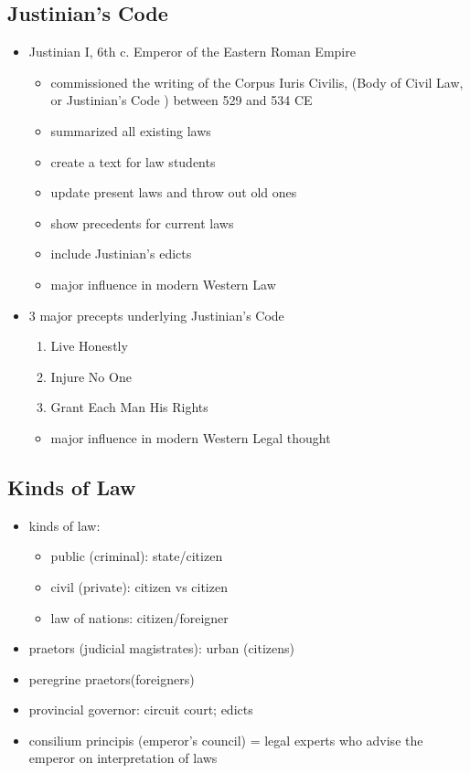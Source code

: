 \documentclass[12pt, twoside]{article}
\begin{document}
\subsection{Justinian’s Code}
\begin{itemize}
\item Justinian I, 6th c. Emperor of the Eastern Roman Empire 
	\begin{itemize}
	\item commissioned the writing of the Corpus Iuris Civilis, (Body of Civil Law, or Justinian’s Code ) between 529 and 534 CE
	\item summarized all existing laws
	\item create a text for law students
	\item update present laws and throw out old ones
	\item show precedents for current laws
	\item include Justinian’s edicts
	\item major influence in modern Western Law
	\end{itemize}
\item 3 major precepts underlying Justinian’s Code
	\begin{enumerate}
	\item Live Honestly
	\item Injure No One
	\item Grant Each Man His Rights
	\end{enumerate}
	\begin{itemize}
	\item major influence in modern Western Legal thought
	\end{itemize}
\end{itemize}

\subsection{Kinds of Law}
\begin{itemize}
\item kinds of law: 
	\begin{itemize}
	\item public (criminal): state/citizen
	\item civil (private): citizen vs citizen
	\item law of nations: citizen/foreigner
	\end{itemize}
\item praetors (judicial magistrates): urban (citizens)
\item peregrine praetors(foreigners)
\item provincial governor: circuit court; edicts
\item consilium principis (emperor's council) = legal experts who advise the emperor on interpretation of laws
\end{itemize}
\end{document}
